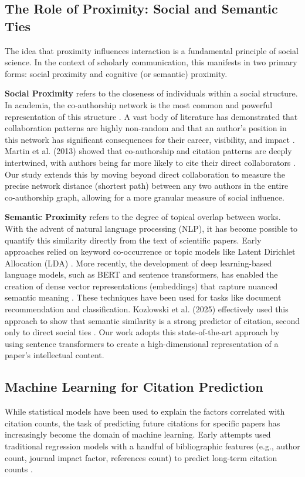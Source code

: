 \documentclass[11pt,a4paper]{article}
\begin{document}
\subsection{The Role of Proximity: Social and Semantic Ties}
The idea that proximity influences interaction is a fundamental principle of social science. In the context of scholarly communication, this manifests in two primary forms: social proximity and cognitive (or semantic) proximity.

\textbf{Social Proximity} refers to the closeness of individuals within a social structure. In academia, the co-authorship network is the most common and powerful representation of this structure \cite{newman2004}. A vast body of literature has demonstrated that collaboration patterns are highly non-random and that an author's position in this network has significant consequences for their career, visibility, and impact \cite{kumar2015}. Martin et al. (2013) showed that co-authorship and citation patterns are deeply intertwined, with authors being far more likely to cite their direct collaborators \cite{martin2013}. Our study extends this by moving beyond direct collaboration to measure the precise network distance (shortest path) between any two authors in the entire co-authorship graph, allowing for a more granular measure of social influence.

\textbf{Semantic Proximity} refers to the degree of topical overlap between works. With the advent of natural language processing (NLP), it has become possible to quantify this similarity directly from the text of scientific papers. Early approaches relied on keyword co-occurrence or topic models like Latent Dirichlet Allocation (LDA) \cite{blei2003}. More recently, the development of deep learning-based language models, such as BERT and sentence transformers, has enabled the creation of dense vector representations (embeddings) that capture nuanced semantic meaning \cite{devlin2019}. These techniques have been used for tasks like document recommendation and classification. Kozlowski et al. (2025) effectively used this approach to show that semantic similarity is a strong predictor of citation, second only to direct social ties \cite{kozlowski2025}. Our work adopts this state-of-the-art approach by using sentence transformers to create a high-dimensional representation of a paper's intellectual content.

\subsection{Machine Learning for Citation Prediction}
While statistical models have been used to explain the factors correlated with citation counts, the task of predicting future citations for specific papers has increasingly become the domain of machine learning. Early attempts used traditional regression models with a handful of bibliographic features (e.g., author count, journal impact factor, references count) to predict long-term citation counts \cite{lokker2008}.
\end{document}
